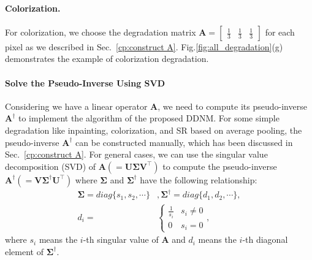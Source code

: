 \documentclass{article} \usepackage{iclr2023_conference,times}
\begin{document}
\paragraph{Colorization.} For colorization, we choose the degradation matrix $\mathbf{A}=\begin{bmatrix}\frac{1}{3} & \frac{1}{3} & \frac{1}{3}\end{bmatrix}$ for each pixel as we described in Sec.~\ref{cp:construct A}. Fig.\ref{fig:all_degradation}(g) demonstrates the example of colorization degradation.

\paragraph{Solve the Pseudo-Inverse Using SVD} Considering we have a linear operator $\mathbf{A}$, we need to compute its pseudo-inverse $\mathbf{A}^\dagger$ to implement the algorithm of 
the proposed DDNM. For some simple degradation like inpainting, colorization, and SR based on average pooling, the pseudo-inverse $\mathbf{A}^{\dagger}$ can be constructed manually, which has been discussed in Sec.~\ref{cp:construct A}. For general cases, we can use the singular value decomposition (SVD) of $\mathbf{A}(=\mathbf{U}\mathbf{\Sigma}\mathbf{V}^{\top})$ to compute the pseudo-inverse $\mathbf{A}^\dagger(=\mathbf{V}\mathbf{\Sigma}^\dagger\mathbf{U}^{\top})$ where $\mathbf{\Sigma}$ and $\mathbf{\Sigma}^\dagger$ have the following relationship:
\begin{align}
\mathbf{\Sigma}=diag\{s_1, s_2, \cdots\}&,\mathbf{\Sigma}^\dagger=diag\{d_1, d_2, \cdots\},\\
d_i = &\begin{cases}
    \frac{1}{s_i}& s_i\ne 0\\
    0& s_i = 0
\end{cases},
\end{align}
where $s_i$ means the $i$-th singular value of $\mathbf{A}$ and $d_i$ means the $i$-th diagonal element of $\mathbf{\Sigma}^\dagger$.
\end{document}
